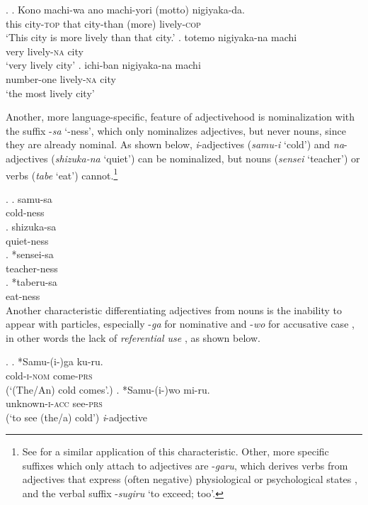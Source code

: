 \ex. \ag. Kono machi-wa ano machi-yori (motto) nigiyaka-da.\\
this city-\textsc{top} that city-than (more) lively-\textsc{cop}\\
`This city is more lively than that city.’ \label{machi-yori}
\bg. totemo nigiyaka-na machi\\
very lively-\textsc{na} city\\
`very lively city' \label{totemonigiyaka}
\cg. ichi-ban nigiyaka-na machi\\
number-one lively-\textsc{na} city\\
`the most lively city' \label{machi-ichiban}

Another, more language-specific, feature of adjectivehood is nominalization with the suffix -\textit{sa} `-ness’, which only nominalizes adjectives, but never nouns, since they are already nominal. As shown below, \textit{i}-adjectives (\textit{samu-i} `cold’) and \textit{na}-adjectives (\textit{shizuka-na} `quiet’) can be nominalized, but nouns (\textit{sensei} `teacher’) or verbs (\textit{tabe} `eat’) cannot.\footnote{See \citet{teramura:1982:nihongo, wenck:1974:systematische, urushibara:1993:syntactic, rickmeyer:1995:japanische, kato:2003:nihongo, muraki:2012:nihongo} for a similar application of this characteristic. Other, more specific suffixes which only attach to adjectives are -\textit{garu}, which derives verbs from adjectives that express (often negative) physiological or psychological states \citep{urushibara:1993:syntactic}, and the verbal suffix -\textit{sugiru} `to exceed; too’.}

\ex. \ag. samu-sa\\
cold-ness\\
\bg. shizuka-sa\\
quiet-ness\\
\cg. *sensei-sa\\
teacher-ness\\
\dg. *taberu-sa\\
eat-ness\\

Another characteristic differentiating adjectives from nouns is the inability to appear with particles, especially -\textit{ga} for nominative and -\textit{wo} for accusative case \citep{suzuki:1972:nihon, martin:1975:reference, teramura:1982:nihongo, nakayama:2004:tokubetsu, muraki:2012:nihongo}, in other words the lack of \textit{referential use} \citep{oshima:2019:gradability}, as shown below.

\ex. \ag. *Samu-(i-)ga ku-ru.\\
cold-\textsc{i-nom} come-\textsc{prs}\\
(`(The/An) cold comes’.)
\bg. *Samu-(i-)wo mi-ru.\\
unknown-\textsc{i-acc} see-\textsc{prs}\\
(`to see (the/a) cold’) \null \hfill \textit{i}-adjective

